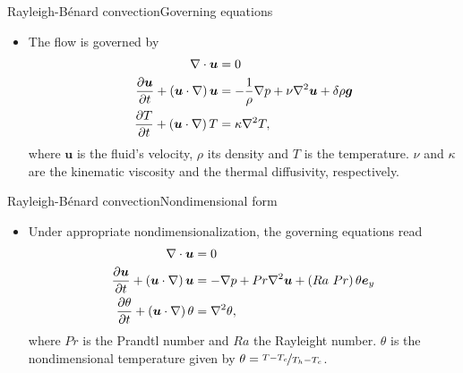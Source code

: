 \documentclass[usenames,dvipsnames,svgnames,10pt,aspectratio=169]{beamer}
\begin{document}
\begin{frame}[t, c]{Rayleigh-Bénard convection}{Governing equations}
	\begin{itemize}
		\item The flow is governed by
		\begin{equation}
			\begin{aligned}
				\nabla \cdot \bm{u} & = 0 \\
				\displaystyle \frac{\partial \bm{u}}{\partial t} + \left( \bm{u} \cdot \nabla \right) \bm{u} & = - \frac{1}{\rho} \nabla p + \nu \nabla^2 \bm{u} + \delta \rho \bm{g} \\
				\displaystyle \frac{\partial T}{\partial t} + \left( \bm{u} \cdot \nabla \right) T & = \kappa \nabla^2 T,
			\end{aligned}
			\notag
		\end{equation}
		where $\bm{u}$ is the fluid's velocity, $\rho$ its density and $T$ is the temperature. $\nu$ and $\kappa$ are the kinematic viscosity and the thermal diffusivity, respectively.
	\end{itemize}

	\vspace{1cm}
\end{frame}

\begin{frame}[t, c]{Rayleigh-Bénard convection}{Nondimensional form}
	\begin{itemize}
		\item Under appropriate nondimensionalization, the governing equations read
		\begin{equation}
			\begin{aligned}
				\nabla \cdot \bm{u} & = 0 \\
				\displaystyle \frac{\partial \bm{u}}{\partial t} + \left( \bm{u} \cdot \nabla \right) \bm{u} & = - \nabla p + Pr \nabla^2 \bm{u} + \left( Ra\ Pr \right) \theta \bm{e}_y \\
				\displaystyle \frac{\partial \theta}{\partial t} + \left( \bm{u} \cdot \nabla \right) \theta & = \nabla^2 \theta,
			\end{aligned}
			\notag
		\end{equation}
		where $Pr$ is the Prandtl number and $Ra$ the Rayleight number. $\theta$ is the nondimensional temperature given by $\theta = \nicefrac{T-T_c}{T_h - T_c}$.
	\end{itemize}

	\vspace{1cm}
\end{frame}
\end{document}
